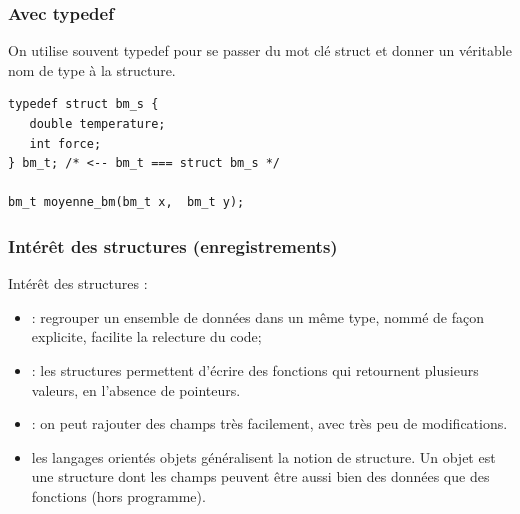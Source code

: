 \documentclass[xcolor=pdftex,svgnames,table]{beamer}
\begin{document}
\begin{frame}[fragile]
  \frametitle{Avec typedef}
  On utilise souvent \alert{typedef} pour se passer du mot clé struct et
  donner un véritable nom de type à la structure.

\begin{lstlisting}
typedef struct bm_s {
   double temperature;
   int force;
} bm_t; /* <-- bm_t === struct bm_s */

bm_t moyenne_bm(bm_t x,  bm_t y);
\end{lstlisting}
\end{frame}

\begin{frame}
  \frametitle{Intérêt des structures (enregistrements)}

Intérêt des structures  :
  \begin{itemize}
   \item {} : regrouper un ensemble
      de données dans un même type, nommé de façon explicite,
      facilite la relecture du code;\pause
  \item {} : les structures permettent d'écrire des
    fonctions qui retournent plusieurs valeurs, en l'absence de pointeurs.\pause
    \item {} : on peut rajouter des champs très
      facilement, avec très peu de modifications.\pause
    \item {} les langages orientés objets
      généralisent la notion de structure. Un objet est une structure
      dont les champs peuvent être aussi bien des données que des
      fonctions (hors programme).
  \end{itemize}
\end{frame}
\end{document}
